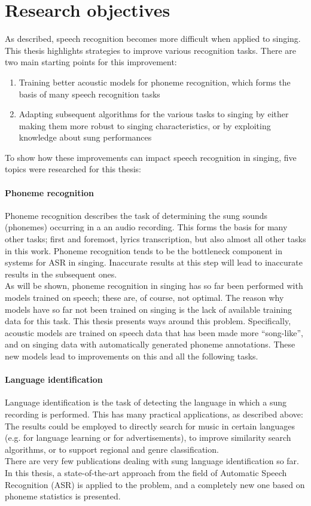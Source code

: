 \section{Research objectives}
As described, speech recognition becomes more difficult when applied to singing. This thesis highlights strategies to improve various recognition tasks. There are two main starting points for this improvement:
\begin{enumerate}
\item Training better acoustic models for phoneme recognition, which forms the basis of many speech recognition tasks
\item Adapting subsequent algorithms for the various tasks to singing by either making them more robust to singing characteristics, or by exploiting knowledge about sung performances
\end{enumerate}

To show how these improvements can impact speech recognition in singing, five topics were researched for this thesis:

\paragraph{Phoneme recognition}
Phoneme recognition describes the task of determining the sung sounds (phonemes) occurring in a an audio recording. This forms the basis for many other tasks; first and foremost, lyrics transcription, but also almost all other tasks in this work. Phoneme recognition tends to be the bottleneck component in systems for ASR in singing. Inaccurate results at this step will lead to inaccurate results in the subsequent ones.\\
As will be shown, phoneme recognition in singing has so far been performed with models trained on speech; these are, of course, not optimal. The reason why models have so far not been trained on singing is the lack of available training data for this task. This thesis presents ways around this problem. Specifically, acoustic models are trained on speech data that has been made more ``song-like'', and on singing data with automatically generated phoneme annotations. These new models lead to improvements on this and all the following tasks.

\paragraph{Language identification}
Language identification is the task of detecting the language in which a sung recording is performed. This has many practical applications, as described above: The results could be employed to directly search for music in certain languages (e.g. for language learning or for advertisements), to improve similarity search algorithms, or to support regional and genre classification.\\
There are very few publications dealing with sung language identification so far. In this thesis, a state-of-the-art approach from the field of Automatic Speech Recognition (ASR) is applied to the problem, and a completely new one based on phoneme statistics is presented.

